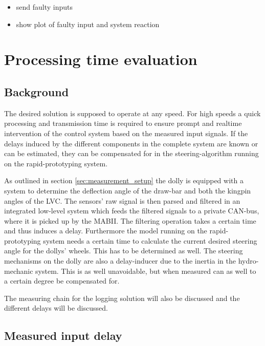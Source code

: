 \documentclass[ExampleMasters.tex]{subfiles}
\begin{document}
\begin{itemize}
	\item send faulty inputs
	\item show plot of faulty input and system reaction
	
\end{itemize}
\section{Processing time evaluation}
\label{chap:processing_time_delay}
\subsection{Background}
The desired solution is supposed to operate at any speed. For high speeds a quick processing and transmission time is required to ensure prompt and realtime intervention of the control system based on the measured input signals. If the delays induced by the different components in the complete system are known or can be estimated, they can be compensated for in the steering-algorithm running on the rapid-prototyping system.

As outlined in section \ref{sec:measurement_setup} the dolly is equipped with a system to determine the deflection angle of the draw-bar and both the kingpin angles of the LVC. The sensors' raw signal is then parsed and filtered in an integrated low-level system which feeds the filtered signals to a private CAN-bus, where it is picked up by the MABII. The filtering operation takes a certain time and thus induces a delay. Furthermore the model running on the rapid-prototyping system needs a certain time to calculate the current desired steering angle for the dollys' wheels. This has to be determined as well. The steering mechanisms on the dolly are also a delay-inducer due to the inertia in the hydro-mechanic system. This is as well unavoidable, but when measured can as well to a certain degree be compensated for. 

The measuring chain for the logging solution will also be discussed and the different delays will be discussed. 

\subsection{Measured input delay}
\label{sec:measuring_delay}
\end{document}
